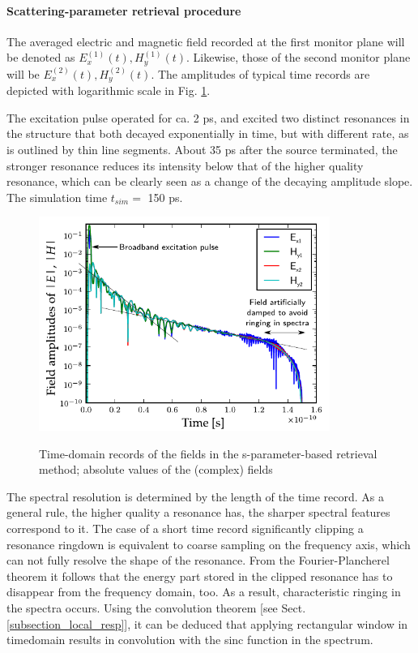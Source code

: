 \paragraph{Scattering-parameter retrieval procedure} %
The averaged electric and magnetic field recorded at the first monitor plane will be denoted as $E_{x}^{(1)}(t), H_{y}^{(1)}(t)$. Likewise, those of the second monitor plane will be $E_{x}^{(2)}(t), H_{y}^{(2)}(t)$. The amplitudes of typical time records are depicted with logarithmic scale in Fig. \ref{fg_sparam_timedomain}. 

The excitation pulse operated for ca. 2 ps, and excited two distinct resonances in the structure that both decayed exponentially in time, but with different rate, as is outlined by thin line segments. About 35 ps after the source terminated, the stronger resonance reduces its intensity below that of the higher quality resonance, which can be clearly seen as a change of the decaying amplitude slope. The simulation time $t_{sim} =$ 150 ps.
\begin{figure}[h] \centering \caption{Time-domain records of the fields in the s-parameter-based retrieval method; absolute values of the (complex) fields} \includegraphics[width=9.5cm]{img/sim_timedomain_debug.pdf} \label{fg_sparam_timedomain} \end{figure}

The spectral resolution is determined by the length of the time record. As a general rule, the higher quality a resonance has, the sharper spectral features correspond to it. The case of a short time record significantly clipping a resonance ringdown is equivalent to coarse sampling on the frequency axis, which can not fully resolve the shape of the resonance. From the Fourier-Plancherel theorem it follows that the energy part stored in the clipped resonance has to disappear from the frequency domain, too. As a result, characteristic ringing in the spectra occurs. Using the convolution theorem [see Sect. \ref{subsection_local_resp}], it can be deduced that applying rectangular window in timedomain results in convolution with the sinc function in the spectrum. 

